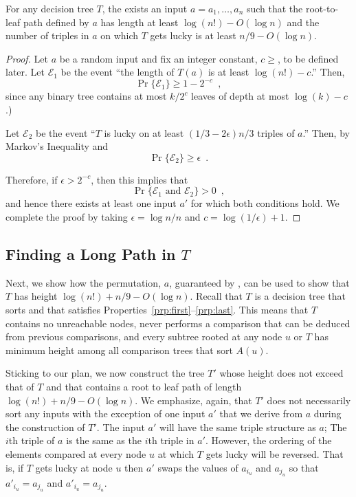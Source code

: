 \documentclass{patmorin}
\begin{document}
\begin{lem}
  For any decision tree $T$, the exists an input $a=a_1,\ldots,a_n$
  such that the root-to-leaf path defined by $a$ has length at least
  $\log(n!)-O(\log n)$ and the number of triples in $a$ on which $T$
  gets lucky is at least $n/9-O(\log n)$.
\end{lem}

\begin{proof}
  Let $a$ be a random input and fix an integer constant, $c\ge $, to be
  defined later.  Let $\mathcal{E}_1$ be the event
  ``the length of $T(a)$ is at least $\log(n!)-c$.''  Then,
  \[
     \Pr\{\mathcal{E}_1\} \ge 1-2^{-c} \enspace ,
  \]
  since any binary tree contains at most $k/2^c$ leaves of depth at most
  $\log(k)-c$.)
  
  Let $\mathcal{E}_2$ be the event ``$T$ is lucky on at least
  $(1/3-2\epsilon)n/3$ triples of $a$.'' Then, by Markov's Inequality and
  \[
     \Pr\{\mathcal{E}_2\} \ge \epsilon \enspace .
  \]
  
  Therefore, if $\epsilon > 2^{-c}$, then this implies that
  \[
      \Pr\{\mbox{$\mathcal{E}_1$ and $\mathcal{E}_2$}\} > 0 \enspace ,
  \]
  and hence there exists at least one input $a'$ for which both
  conditions hold.  We complete the proof by taking $\epsilon=\log n/ n$
  and $c=\log(1/\epsilon)+1$.
\end{proof}

\subsection{Finding a Long Path in $T$}

Next, we show how the permutation, $a$, guaranteed by
, can be used to show that $T$ has height
$\log(n!)+n/9-O(\log n)$.  Recall that $T$ is a decision tree that
sorts and that satisfies Properties~\ref{prp:first}--\ref{prp:last}.
This means that $T$ contains no unreachable nodes, never performs a
comparison that can be deduced from previous comparisons, and every
subtree rooted at any node $u$ or $T$ has minimum height among all
comparison trees that sort $A(u)$.

Sticking to our plan, we now construct the tree $T'$ whose height
does not exceed that of $T$ and that contains a root to leaf path of
length $\log(n!)+n/9-O(\log n)$.  We emphasize, again, that $T'$ does
not necessarily sort any inputs with the exception of one input $a'$
that we derive from $a$ during the construction of $T'$.  The input $a'$
will have the same triple structure as $a$; The $i$th triple of $a$ is the
same as the $i$th triple in $a'$. However, the ordering of the elements
compared at every node $u$ at which $T$ gets lucky will be reversed.
That is, if $T$ gets lucky at node $u$ then $a'$ swaps the values of
$a_{i_u}$ and $a_{j_u}$ so that $a'_{i_u}=a_{j_u}$ and $a'_{i_u}=a_{j_u}$.
\end{document}
